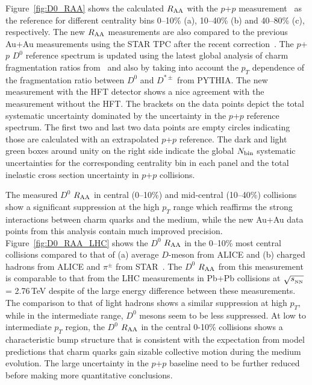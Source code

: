 \documentclass[%
 reprint,	
 amsmath,amssymb,
 aps,
 prc,
]{revtex4-1}
\begin{document}
Figure~\ref{fig:D0_RAA} shows the calculated $R_{\rm AA}$ with the $p$+$p$ measurement~\cite{Star_D_pp} as the reference for different centrality bins 0--10\% (a), 10--40\% (b) and 40--80\% (c), respectively. The new $R_{\rm AA}$ measurements are also compared to the previous Au+Au measurements using the STAR TPC after the recent correction~\cite{Star_D_RAA}. The $p$+$p$ $D^0$ reference spectrum is updated using the latest global analysis of charm fragmentation ratios from~\cite{charm_frag} and also by taking into account the $p_T$ dependence of the fragmentation ratio between $D^0$ and $D^{*\pm}$ from PYTHIA. The new measurement with the HFT detector shows a nice agreement with the measurement without the HFT. The brackets on the data points depict the total systematic uncertainty dominated by the uncertainty in the $p$+$p$ reference spectrum. The first two and last two data points are empty circles indicating those are calculated with an extrapolated $p$+$p$ reference. The dark and light green boxes around unity on the right side indicate the global $N_{\rm bin}$ systematic uncertainties for the corresponding centrality bin in each panel and the total inelastic cross section uncertainty in $p$+$p$ collisions.

The measured $D^0$ $R_{\rm AA}$ in central (0--10\%) and mid-central (10--40\%) collisions show a significant suppression at the high $p_{T}$ range which reaffirms the strong interactions between charm quarks and the medium, while the new Au+Au data points from this analysis contain much improved precision. Figure~\ref{fig:D0_RAA_LHC} shows the $D^0$ $R_{\rm AA}$ in the 0--10\% most central collisions compared to that of (a) average $D$-meson from ALICE and (b) charged hadrons from ALICE and $\pi^{\pm}$ from STAR~\cite{Alice_D_RAA_2,Alice_hadron_RAA,PhenixPi0}. The $D^0$ $R_{\rm AA}$ from this measurement is comparable to that from the LHC measurements in Pb+Pb collisions at $\sqrt{s_{_{\rm NN}}}$ = 2.76\,TeV despite of the large energy difference between these measurements.
The comparison to that of light hadrons shows a similar suppression at high $p_{T}$, while in the intermediate range, $D^0$ mesons seem to be less suppressed. At low to intermediate $p_{T}$ region, the $D^0$ $R_{\rm AA}$ in the central 0-10\% collisions shows a characteristic bump structure that is consistent with the expectation from model predictions that charm quarks gain sizable collective motion during the medium evolution. The large uncertainty in the $p$+$p$ baseline need to be further reduced before making more quantitative conclusions.
\end{document}
